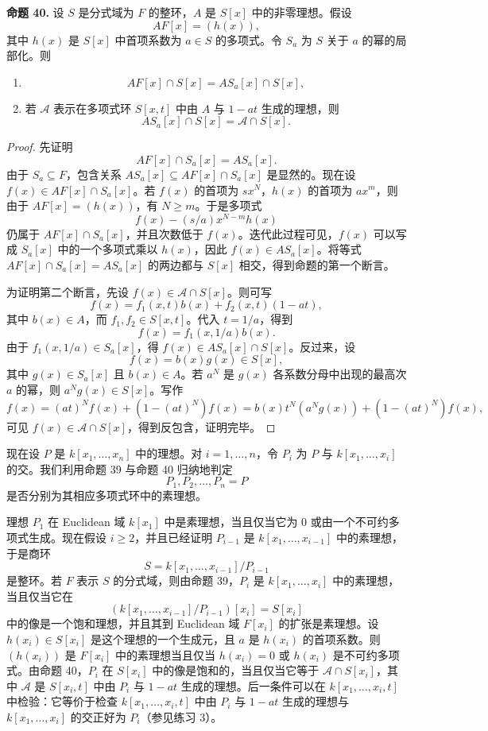 \noindent\textbf{命题 40.} 设 $S$ 是分式域为 $F$ 的整环，$A$ 是 $S[x]$ 中的非零理想。假设
\[
AF[x]=(h(x)),
\]
其中 $h(x)$ 是 $S[x]$ 中首项系数为 $a\in S$ 的多项式。令 $S_a$ 为 $S$ 关于 $a$ 的幂的局部化。则
\begin{enumerate}[label=(\arabic*)]
	\item
	\[
	AF[x]\cap S[x]=AS_a[x]\cap S[x],
	\]
	\item 若 $\mathcal A$ 表示在多项式环 $S[x,t]$ 中由 $A$ 与 $1-at$ 生成的理想，则
	\[
	AS_a[x]\cap S[x]=\mathcal A\cap S[x].
	\]
\end{enumerate}

\begin{proof}
	先证明
	\[
	AF[x]\cap S_a[x]=AS_a[x].
	\]
	由于 $S_a\subseteq F$，包含关系 $AS_a[x]\subseteq AF[x]\cap S_a[x]$ 是显然的。现在设 $f(x)\in AF[x]\cap S_a[x]$。若 $f(x)$ 的首项为 $sx^N$，$h(x)$ 的首项为 $ax^m$，则由于 $AF[x]=(h(x))$，有 $N\ge m$。于是多项式
	\[
	f(x)-(s/a)x^{N-m}h(x)
	\]
	仍属于 $AF[x]\cap S_a[x]$，并且次数低于 $f(x)$。迭代此过程可见，$f(x)$ 可以写成 $S_a[x]$ 中的一个多项式乘以 $h(x)$，因此 $f(x)\in AS_a[x]$。将等式 $AF[x]\cap S_a[x]=AS_a[x]$ 的两边都与 $S[x]$ 相交，得到命题的第一个断言。
	
	为证明第二个断言，先设 $f(x)\in\mathcal A\cap S[x]$。则可写
	\[
	f(x)=f_1(x,t)b(x)+f_2(x,t)(1-at),
	\]
	其中 $b(x)\in A$，而 $f_1,f_2\in S[x,t]$。代入 $t=1/a$，得到
	\[
	f(x)=f_1(x,1/a)b(x).
	\]
	由于 $f_1(x,1/a)\in S_a[x]$，得 $f(x)\in AS_a[x]\cap S[x]$。反过来，设
	\[
	f(x)=b(x)g(x)\in S[x],
	\]
	其中 $g(x)\in S_a[x]$ 且 $b(x)\in A$。若 $a^N$ 是 $g(x)$ 各系数分母中出现的最高次 $a$ 的幂，则 $a^Ng(x)\in S[x]$。写作
	\[
	f(x)=(at)^Nf(x)+(1-(at)^N)f(x)
	=b(x)t^N(a^Ng(x))+(1-(at)^N)f(x),
	\]
	可见 $f(x)\in\mathcal A\cap S[x]$，得到反包含，证明完毕。
\end{proof}

现在设 $P$ 是 $k[x_1,\ldots,x_n]$ 中的理想。对 $i=1,\ldots,n$，令 $P_i$ 为 $P$ 与 $k[x_1,\ldots,x_i]$ 的交。我们利用命题 39 与命题 40 归纳地判定
\[
P_1,P_2,\ldots,P_n=P
\]
是否分别为其相应多项式环中的素理想。

理想 $P_1$ 在 Euclidean 域 $k[x_1]$ 中是素理想，当且仅当它为 $0$ 或由一个不可约多项式生成。现在假设 $i\ge2$，并且已经证明 $P_{i-1}$ 是 $k[x_1,\ldots,x_{i-1}]$ 中的素理想，于是商环
\[
S=k[x_1,\ldots,x_{i-1}]/P_{i-1}
\]
是整环。若 $F$ 表示 $S$ 的分式域，则由命题 39，$P_i$ 是 $k[x_1,\ldots,x_i]$ 中的素理想，当且仅当它在
\[
(k[x_1,\ldots,x_{i-1}]/P_{i-1})[x_i]=S[x_i]
\]
中的像是一个饱和理想，并且其到 Euclidean 域 $F[x_i]$ 的扩张是素理想。设 $h(x_i)\in S[x_i]$ 是这个理想的一个生成元，且 $a$ 是 $h(x_i)$ 的首项系数。则 $(h(x_i))$ 是 $F[x_i]$ 中的素理想当且仅当 $h(x_i)=0$ 或 $h(x_i)$ 是不可约多项式。由命题 40，$P_i$ 在 $S[x_i]$ 中的像是饱和的，当且仅当它等于 $\mathcal A\cap S[x_i]$，其中 $\mathcal A$ 是 $S[x_i,t]$ 中由 $P_i$ 与 $1-at$ 生成的理想。后一条件可以在 $k[x_1,\ldots,x_i,t]$ 中检验：它等价于检查 $k[x_1,\ldots,x_i,t]$ 中由 $P_i$ 与 $1-at$ 生成的理想与 $k[x_1,\ldots,x_i]$ 的交正好为 $P_i$（参见练习 3）。

